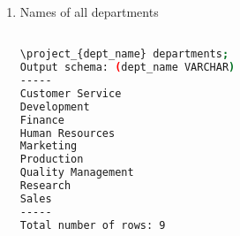 \documentclass[12pt, letterpaper, twoside]{article}
\begin{document}
\begin{enumerate}
\begin{lstlisting}[language=Bash]
\end{lstlisting}



\item Names of all departments
\begin{lstlisting}[language=Bash]

\project_{dept_name} departments;
Output schema: (dept_name VARCHAR)
-----
Customer Service
Development
Finance
Human Resources
Marketing
Production
Quality Management
Research
Sales
-----
Total number of rows: 9

\end{lstlisting}



\end{enumerate}





 
\end{document}
